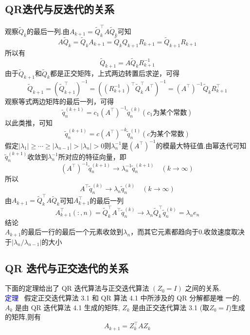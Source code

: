 \documentclass[12pt,a4paper]{article}
\begin{document}
\subsection{QR迭代与反迭代的关系}
观察$\tilde{Q}_{k}$的最后一列.由$A_{k+1}=\tilde{Q}_{k}^{\top} A \tilde{Q}_{k}$可知
$$
A \tilde{Q}_{k}=\tilde{Q}_{k} A_{k+1}=\tilde{Q}_{k} Q_{k+1} R_{k+1}=\tilde{Q}_{k+1} R_{k+1}
$$
所以有
$$
\tilde{Q}_{k+1}=A \tilde{Q}_{k} R_{k+1}^{-1}
$$
由于$\tilde{Q}_{k+1}$和$\tilde{Q}_{k}$都是正交矩阵，上式两边转置后求逆，可得
$$
\tilde{Q}_{k+1}=\left(\tilde{Q}_{k+1}^{\top}\right)^{-1}=\left(\left(R_{k+1}^{-1}\right)^{\top} \tilde{Q}_{k}^{\top} A^{\top}\right)^{-1}=\left(A^{\top}\right)^{-1} \tilde{Q}_{k} R_{k+1}^{\top}
$$
观察等式两边矩阵的最后一列，可得
$$
\tilde{q}_{n}^{(k+1)}=c_{1}\left(A^{\top}\right)^{-1} \tilde{q}_{n}^{(k)}(c_{1}\text{为某个常数})
$$
以此类推，可知
$$
\tilde{q}_{n}^{(k+1)}=c\left(A^{\top}\right)^{-k} \tilde{q}_{n}^{(1)}(c\text{为某个常数})
$$
假定$\left|\lambda_{1}\right| \geq \cdots \geq\left|\lambda_{n-1}\right|>\left|\lambda_{n}\right|>0$则$\lambda_{n}^{-1}$是$\left(A^{\top}\right)^{-1}$的模最大特征值.由幂迭代可知$\tilde{q}_{n}^{(k+1)}$收敛到$\lambda_{n}^{-1}$所对应的特征向量，即
$$
\left(A^{\top}\right)^{-1} \tilde{q}_{n}^{(k+1)} \rightarrow \lambda_{n}^{-1} \tilde{q}_{n}^{(k+1)} \quad(k \rightarrow \infty)
$$
所以
$$
A^{\top} \tilde{q}_{n}^{(k)} \rightarrow \lambda_{n} \tilde{q}_{n}^{(k)} \quad(k \rightarrow \infty)
$$
由$A_{k+1}=\tilde{Q}_{k}^{\top} A \tilde{Q}_{k}$可知$A_{k+1}^{\top}$的最后一列
$$
A_{k+1}^{\top}( :, n)=\tilde{Q}_{k}^{\top} A^{\top} \tilde{q}_{n}^{(k)} \rightarrow \lambda_{n} \tilde{Q}_{k}^{\top} \tilde{q}_{n}^{(k)}=\lambda_{n} e_{n}
$$
$\mathbf{结论}$\\
$A_{k+1}$的最后一行的最后一个元素收敛到$\lambda_{n}$，而其它元素都趋向于0.收敛速度取决于$\left|\lambda_{n} / \lambda_{n-1}\right|$的大小
\subsection{QR 迭代与正交迭代的关系}
下面的定理给出了 QR 迭代算法与正交迭代算法 $(Z_{0} = I)$ 之间的关系.\\
\textcolor{blue}{定理} ~假定正交迭代算法 3.1 和 QR 算法 4.1 中所涉及的 QR 分解都是唯 一的. $A_{k}$ 是由 QR 迭代算法 4.1 生成的矩阵, $Z_{k}$ 是由正交迭代算法 3.1 (取$Z_{0} =I$)生成的矩阵,则有
$$
A_{k+1}=Z_{k}^{\top} A Z_{k}
$$
\end{document}

